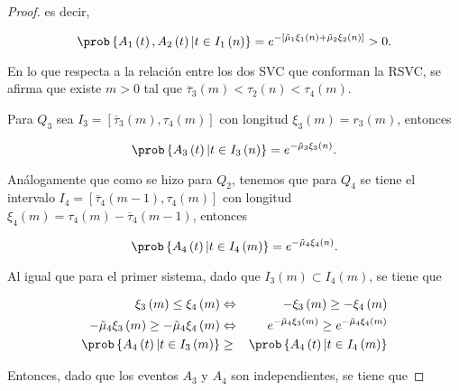 \begin{proof}
es decir, 

\begin{equation}
\prob\left\{A_{1}\left(t\right),A_{2}\left(t\right)|t\in I_{1}\left(n\right)\right\}
=e^{-\left[\tilde{\mu}_{1}\xi_{1}\left(n\right)+\tilde{\mu}_{2}\xi_{2}
\left(n\right)\right]}>0.
\end{equation}

En lo que respecta a la relaci\'on entre los dos SVC que conforman la RSVC, se afirma que existe $m>0$ tal que $\overline{\tau}_{3}\left(m\right)<\tau_{2}\left(n\right)<\tau_{4}\left(m\right)$.

Para $Q_{3}$ sea $I_{3}=\left[\overline{\tau}_{3}\left(m\right),\tau_{4}\left(m\right)\right]$ con longitud  $\xi_{3}\left(m\right)=r_{3}\left(m\right)$, entonces 

\begin{equation}
\prob\left\{A_{3}\left(t\right)|t\in I_{3}\left(n\right)\right\}=e^{-\tilde{\mu}_{3}\xi_{3}\left(n\right)}.
\end{equation} 

An\'alogamente que como se hizo para $Q_{2}$, tenemos que para $Q_{4}$ se tiene el intervalo $I_{4}=\left[\overline{\tau}_{4}\left(m-1\right),\tau_{4}\left(m\right)\right]$ con longitud $\xi_{4}\left(m\right)=\tau_{4}\left(m\right)-\overline{\tau}_{4}\left(m-1\right)$, entonces


\begin{equation}
\prob\left\{A_{4}\left(t\right)|t\in I_{4}\left(m\right)\right\}=e^{-\tilde{\mu}_{4}\xi_{4}\left(n\right)}.
\end{equation} 

Al igual que para el primer sistema, dado que $I_{3}\left(m\right)\subset I_{4}\left(m\right)$, se tiene que

\begin{eqnarray*}
\xi_{3}\left(m\right)\leq\xi_{4}\left(m\right)&\Leftrightarrow& -\xi_{3}\left(m\right)\geq-\xi_{4}\left(m\right)
\\
-\tilde{\mu}_{4}\xi_{3}\left(m\right)\geq-\tilde{\mu}_{4}\xi_{4}\left(m\right)&\Leftrightarrow&
e^{-\tilde{\mu}_{4}\xi_{3}\left(m\right)}\geq e^{-\tilde{\mu}_{4}\xi_{4}\left(m\right)}\\
\prob\left\{A_{4}\left(t\right)|t\in I_{3}\left(m\right)\right\}&\geq&
\prob\left\{A_{4}\left(t\right)|t\in I_{4}\left(m\right)\right\}
\end{eqnarray*}

Entonces, dado que los eventos $A_{3}$ y $A_{4}$ son independientes, se tiene que


\end{proof}
